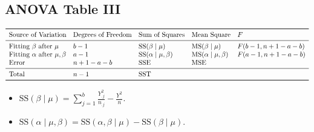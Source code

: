 \subsection*{ANOVA Table III}
\[ \begin{array}{lllll}
        \toprule
        \text{Source of Variation}                    & \text{Degrees of Freedom} & \text{Sum of Squares}           & \text{Mean Square}              & F              \\
        \midrule
        \text{Fitting }\beta\text{ after }\mu         & b-1                       & \text{SS}(\beta\mid \mu)        & \text{MS}(\beta\mid \mu)        & F(b-1,n+1-a-b) \\
        \text{Fitting }\alpha \text{ after }\mu,\beta & a-1                       & \text{SS}(\alpha\mid \mu,\beta) & \text{MS}(\alpha\mid \mu,\beta) & F(a-1,n+1-a-b) \\
        \text{Error}                                  & n+1-a-b                   & \SSE                            & \MSE                                             \\
        \midrule
        \text{Total}                                  & n-1                       & \SST                                                                               \\
        \bottomrule
    \end{array} \]
\begin{itemize}
    \item $ \displaystyle \text{SS}(\beta\mid \mu) =\sum_{j=1}^{b}\frac{Y_{.j}^2}{n_{.j}}-\frac{Y_{..}^2}{n} $.
    \item $ \displaystyle \text{SS}(\alpha\mid \mu,\beta) =\text{SS}(\alpha,\beta\mid \mu)-\text{SS}(\beta\mid \mu) $.
\end{itemize}
